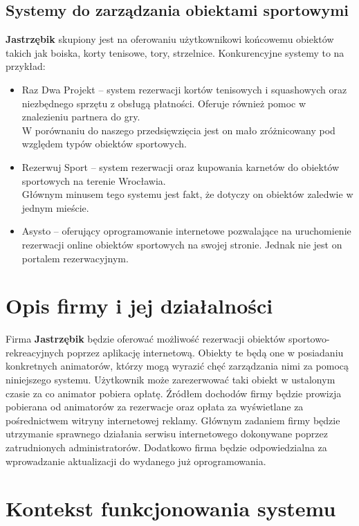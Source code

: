 \documentclass[a4paper,11pt]{article}
\begin{document}
    \subsection{Systemy do zarządzania obiektami sportowymi}
    
    \textbf{Jastrzębik} skupiony jest na oferowaniu użytkownikowi końcowemu obiektów takich jak boiska, korty tenisowe, tory, strzelnice.
    Konkurencyjne systemy to na przykład:
    
    \begin{itemize}
        \item Raz Dwa Projekt -- system rezerwacji kortów tenisowych i squashowych oraz niezbędnego sprzętu z obsługą płatności. Oferuje również pomoc w znalezieniu partnera do gry.
        \\ W porównaniu do naszego przedsięwzięcia jest on mało zróżnicowany pod względem typów obiektów sportowych.
        \item Rezerwuj Sport -- system rezerwacji oraz kupowania karnetów do obiektów sportowych na terenie Wrocławia.
        \\ Głównym minusem tego systemu jest fakt, że dotyczy on obiektów zaledwie w jednym mieście.
        \item Asysto -- oferujący oprogramowanie internetowe pozwalające na uruchomienie rezerwacji online obiektów sportowych na swojej stronie. Jednak nie jest on portalem rezerwacyjnym.
    \end{itemize}
    
\section{Opis firmy i jej działalności}

    Firma \textbf{Jastrzębik} będzie oferować możliwość rezerwacji obiektów sportowo-rekreacyjnych poprzez aplikację internetową. Obiekty te będą one w posiadaniu konkretnych animatorów, którzy mogą wyrazić chęć zarządzania nimi za pomocą niniejszego systemu.
    Użytkownik może zarezerwować taki obiekt w ustalonym czasie za co animator pobiera opłatę.
    Źródłem dochodów firmy będzie prowizja pobierana od animatorów za rezerwacje oraz opłata za wyświetlane za pośrednictwem witryny internetowej reklamy.
    Głównym zadaniem firmy będzie utrzymanie sprawnego działania serwisu internetowego dokonywane poprzez zatrudnionych administratorów. Dodatkowo firma będzie odpowiedzialna za wprowadzanie aktualizacji do wydanego już oprogramowania.

\section{Kontekst funkcjonowania systemu}
\end{document}
